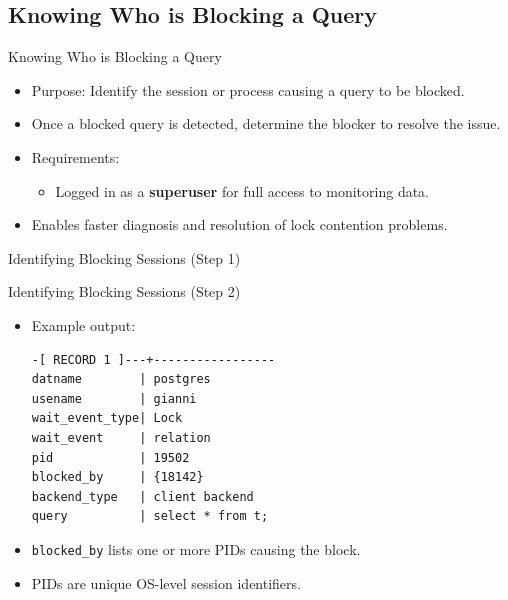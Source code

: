 \documentclass[aspectratio=169]{beamer}
\begin{document}
\subsection{Knowing Who is Blocking a Query}

\begin{frame}{Knowing Who is Blocking a Query}
\begin{itemize}
    \item Purpose: Identify the session or process causing a query to be blocked.
    \item Once a blocked query is detected, determine the blocker to resolve the issue.
    \item Requirements:
    \begin{itemize}
        \item Logged in as a \textbf{superuser} for full access to monitoring data.
    \end{itemize}
    \item Enables faster diagnosis and resolution of lock contention problems.
\end{itemize}
\end{frame}

\begin{frame}[fragile]{Identifying Blocking Sessions (Step 1)}
\end{frame}

\begin{frame}[fragile]{Identifying Blocking Sessions (Step 2)}
\begin{itemize}
    \item Example output:
\begin{verbatim}
-[ RECORD 1 ]---+-----------------
datname        | postgres
usename        | gianni
wait_event_type| Lock
wait_event     | relation
pid            | 19502
blocked_by     | {18142}
backend_type   | client backend
query          | select * from t;
\end{verbatim}
    \item \texttt{blocked\_by} lists one or more PIDs causing the block.
    \item PIDs are unique OS-level session identifiers.
\end{itemize}
\end{frame}
\end{document}
